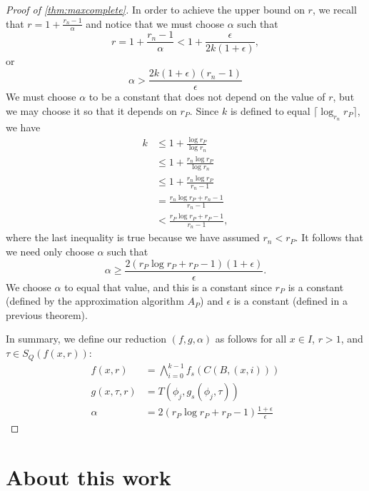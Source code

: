 \documentclass[]{article}
\theoremstyle{plain}
\theoremstyle{definition}
\newcommand{\ceil}[1]{\lceil{#1}\rceil}
\begin{document}
\begin{proof}[Proof of \autoref{thm:maxcomplete}]
  In order to achieve the upper bound on $r$, we recall that $r = 1 + \frac{r_n - 1}{\alpha}$ and notice that we must choose $\alpha$ such that
  \begin{equation*}
    r = 1 + \frac{r_n - 1}{\alpha} < 1 + \frac{\epsilon}{2k(1 + \epsilon)},
  \end{equation*}
  or
  \begin{equation*}
    \alpha > \frac{2k(1 + \epsilon)(r_n - 1)}{\epsilon}
  \end{equation*}
  We must choose $\alpha$ to be a constant that does not depend on the value of $r$, but we may choose it so that it depends on $r_P$.
  Since $k$ is defined to equal $\ceil{\log_{r_n}{r_P}}$, we have
  \begin{align*}
    k & \leq 1 + \frac{\log{r_P}}{\log{r_n}} \\
    & \leq 1 + \frac{r_n \log{r_P}}{\log{r_n}} \\
    & \leq 1 + \frac{r_n \log{r_P}}{r_n - 1} \\
    & = \frac{r_n \log{r_P} + r_n - 1}{r_n - 1} \\
    & < \frac{r_P \log{r_P} + r_P - 1}{r_n - 1},
  \end{align*}
  where the last inequality is true because we have assumed $r_n < r_P$.
  It follows that we need only choose $\alpha$ such that
  \begin{equation*}
    \alpha \geq \frac{2(r_P \log{r_P} + r_P - 1)(1 + \epsilon)}{\epsilon}.
  \end{equation*}
  We choose $\alpha$ to equal that value, and this is a constant since $r_P$ is a constant (defined by the approximation algorithm $A_P$) and $\epsilon$ is a constant (defined in a previous theorem).

  In summary, we define our reduction $(f, g, \alpha)$ as follows for all $x \in I$, $r > 1$, and $\tau \in S_Q(f(x, r))$:
  \begin{align*}
    f(x, r) & = \bigwedge_{i = 0}^{k - 1}{f_s(C(B, (x, i)))} \\
    g(x, \tau, r) & = T(\phi_j, g_s(\phi_j, \tau)) \\
    \alpha & = 2(r_P \log{r_P} + r_P - 1)\frac{1 + \epsilon}{\epsilon}
  \end{align*}
\end{proof}

\section*{About this work}
\end{document}
